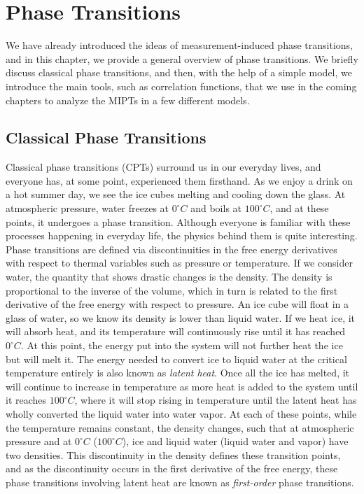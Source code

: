 \chapter{Phase Transitions}
\thispagestyle{empty}
\label{chap:phase_sec}

We have already introduced the ideas of measurement-induced phase transitions, and in this chapter, we provide a general overview of phase transitions. We briefly discuss classical phase transitions, and then, with the help of a simple model, we introduce the main tools, such as correlation functions, that we use in the coming chapters to analyze the MIPTs in a few different models.

\section{Classical Phase Transitions}

Classical phase transitions (CPTs) surround us in our everyday lives, and everyone has, at some point, experienced them firsthand. As we enjoy a drink on a hot summer day, we see the ice cubes melting and cooling down the glass. At atmospheric pressure, water freezes at $0^\circ C$ and boils at $100^\circ C$, and at these points, it undergoes a phase transition. Although everyone is familiar with these processes happening in everyday life, the physics behind them is quite interesting. Phase transitions are defined via discontinuities in the free energy derivatives with respect to thermal variables such as pressure or temperature. If we consider water, the quantity that shows drastic changes is the density. The density is proportional to the inverse of the volume, which in turn is related to the first derivative of the free energy with respect to pressure. An ice cube will float in a glass of water, so we know its density is lower than liquid water. If we heat ice, it will absorb heat, and its temperature will continuously rise until it has reached $0^\circ C$. At this point, the energy put into the system will not further heat the ice but will melt it. The energy needed to convert ice to liquid water at the critical temperature entirely is also known as \textit{latent heat}. Once all the ice has melted, it will continue to increase in temperature as more heat is added to the system until it reaches $100^\circ C$, where it will stop rising in temperature until the latent heat has wholly converted the liquid water into water vapor. At each of these points, while the temperature remains constant, the density changes, such that at atmospheric pressure and at $0^\circ C$ ($100^\circ C$), ice and liquid water (liquid water and vapor) have two densities. This discontinuity in the density defines these transition points, and as the discontinuity occurs in the first derivative of the free energy, these phase transitions involving latent heat are known as \textit{first-order} phase transitions. 

